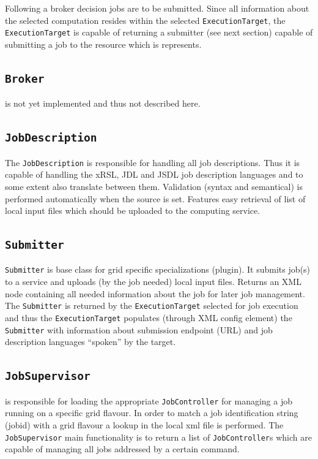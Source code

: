 \documentclass{book}
\newcommand{\ExecutionTarget}{\texttt{ExecutionTarget}}
\newcommand{\Broker}{\texttt{Broker}}
\newcommand{\Submitter}{\texttt{Submitter}}
\newcommand{\JobDescription}{\texttt{JobDescription}}
\newcommand{\JobSupervisor}{\texttt{JobSupervisor}}
\newcommand{\JobController}{\texttt{JobController}}
\begin{document}
Following a broker decision jobs are to be submitted. Since all information about the selected computation resides within the 
selected {\ExecutionTarget}, the {\ExecutionTarget} is capable of returning a submitter (see next section) capable of submitting a 
job to the resource which is represents.

\subsection{{\Broker}} is not yet implemented and thus not described here.

\subsection{{\JobDescription}} The {\JobDescription} is responsible for handling all job descriptions. Thus it is capable of handling the xRSL, JDL and 
JSDL job description languages and to some extent also translate between them. Validation (syntax and semantical) is performed 
automatically when the source is set. Features easy retrieval of list of local input files which should be uploaded to the 
computing service.

\subsection{{\Submitter}} {\Submitter} is base class for grid specific specializations (plugin).  It submits job(s) to a service and 
uploads (by the job needed) local input files. Returns an XML node containing all needed information about the job 
for later job management. The {\Submitter} is returned by the {\ExecutionTarget} selected for job execution and thus the 
{\ExecutionTarget} populates (through XML config element) the {\Submitter} with information about submission endpoint (URL) 
and job description languages ``spoken'' by the target.

\subsection{{\JobSupervisor}} is responsible for loading the appropriate {\JobController} for managing a job running on a specific 
grid flavour. In order to match a job identification string (jobid) with a grid flavour a lookup in the local xml file is 
performed. The {\JobSupervisor} main functionality is to return a list of {\JobController}s which are capable of managing all jobs 
addressed by a certain command.
\end{document}
